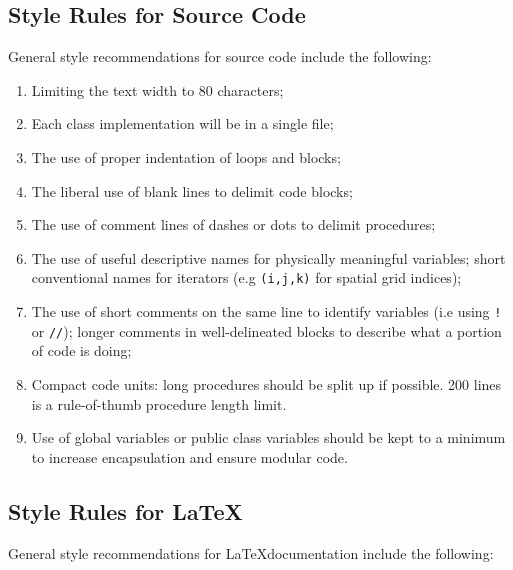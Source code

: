\subsection{Style Rules for Source Code}

General style recommendations for source code include the following:

\begin{enumerate}
\item Limiting the text width to 80 characters;
\item Each class implementation will be in a single file;
\item The use of proper indentation of loops and blocks;
\item The liberal use of blank lines to delimit code blocks;
\item The use of comment lines of dashes or dots to delimit
  procedures;
\item The use of useful descriptive names for physically meaningful
  variables; short conventional names for iterators (e.g
  \texttt{(i,j,k)} for spatial grid indices);
\item The use of short comments on the same line to identify variables
  (i.e using \texttt{!} or \texttt{//}); longer comments in
  well-delineated blocks to describe what a portion of code is doing;
\item Compact code units: long procedures should be split up if
  possible. 200 lines is a rule-of-thumb procedure length limit.
\item Use of global variables or public class variables should be
kept to a minimum to increase encapsulation and ensure modular code.
\end{enumerate}

\subsection{Style Rules for \LaTeX}

General style recommendations for \LaTeX documentation include the
following:

